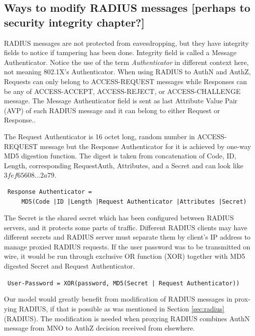 \documentclass[12pt,a4paper,english]{tutthesis}
\begin{document}
\begin{otherlanguage}{english}
\section{Ways to modify RADIUS messages [perhaps to security integrity chapter?]}
\label{sec-4-7}
\label{sec:radius-macs}
RADIUS messages are not protected from eavesdropping, but they have
integrity fields to notice if tampering has been done.  
Integrity field is called a Message Authenticator.
Notice the use of the term \emph{Authenticator} in different context here, not
meaning 802.1X's Authenticator.
When using RADIUS to AuthN and AuthZ, Requests can only belong to ACCESS-REQUEST messages while
Responses can be any of ACCESS-ACCEPT, ACCESS-REJECT, or ACCESS-CHALLENGE message.
The Message Authenticator field is sent as last Attribute Value Pair (AVP)
of each RADIUS message and it can belong 
to either Request or Response.\cite[p.20]{radiusbook}.

The Request Authenticator is 16 octet long, random number in
ACCESS-REQUEST message but the Response Authenticator for it is achieved
by one-way MD5 digestion function. 
The digest is taken from concatenation of Code, ID, Length, corresponding
Request\-Auth, Attributes, and a Secret and can look like 
$3fef65608\ldots 2a79$. 
\begin{verbatim}
 Response Authenticator = 
     MD5(Code |ID |Length |Request Authenticator |Attributes |Secret)
\end{verbatim}
The Secret is the shared secret which has been configured between RADIUS servers,
and it protects some parts of traffic. 
Different RADIUS clients may have different
secrets and RADIUS server must separate them by client's IP address to
manage proxied RADIUS requests\cite{radiusbook}.
If the user password was to be transmitted on wire, it would be run
through exclusive OR function (XOR) together with MD5 digested Secret
and Request
Authenticator.
\begin{center}
{\tt 
User-Password = XOR(password, MD5(Secret | Request Authenticator))}
\end{center}



Our model would greatly benefit from modification of RADIUS messages in proxying
RADIUS, if that is possible as was mentioned in Section \ref{sec:radius}(RADIUS).
The modification is needed when proxying RADIUS combines AuthN message
from MNO to AuthZ decision received from elsewhere.







\end{otherlanguage}
\end{document}
